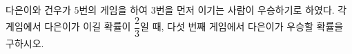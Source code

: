 다은이와 건우가 $5$번의 게임을 하여 $3$번을 먼저 이기는 사람이 우승하기로 하였다. 각 게임에서 다은이가 이길 확률이 \mbox{$\dfrac{2}{3}$일} 때, 다섯 번째 게임에서 다은이가 우승할 확률을 \mbox{구하시오.} 

